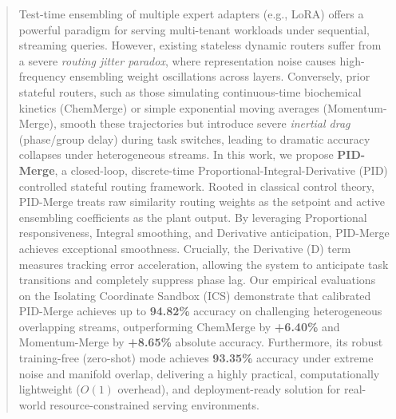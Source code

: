 \begin{abstract}
Test-time ensembling of multiple expert adapters (e.g., LoRA) offers a powerful paradigm for serving multi-tenant workloads under sequential, streaming queries. However, existing stateless dynamic routers suffer from a severe \emph{routing jitter paradox}, where representation noise causes high-frequency ensembling weight oscillations across layers. Conversely, prior stateful routers, such as those simulating continuous-time biochemical kinetics (ChemMerge) or simple exponential moving averages (Momentum-Merge), smooth these trajectories but introduce severe \emph{inertial drag} (phase/group delay) during task switches, leading to dramatic accuracy collapses under heterogeneous streams. In this work, we propose \textbf{PID-Merge}, a closed-loop, discrete-time Proportional-Integral-Derivative (PID) controlled stateful routing framework. Rooted in classical control theory, PID-Merge treats raw similarity routing weights as the setpoint and active ensembling coefficients as the plant output. By leveraging Proportional responsiveness, Integral smoothing, and Derivative anticipation, PID-Merge achieves exceptional smoothness. Crucially, the Derivative (D) term measures tracking error acceleration, allowing the system to anticipate task transitions and completely suppress phase lag. Our empirical evaluations on the Isolating Coordinate Sandbox (ICS) demonstrate that calibrated PID-Merge achieves up to \textbf{94.82\%} accuracy on challenging heterogeneous overlapping streams, outperforming ChemMerge by \textbf{+6.40\%} and Momentum-Merge by \textbf{+8.65\%} absolute accuracy. Furthermore, its robust training-free (zero-shot) mode achieves \textbf{93.35\%} accuracy under extreme noise and manifold overlap, delivering a highly practical, computationally lightweight ($O(1)$ overhead), and deployment-ready solution for real-world resource-constrained serving environments.
\end{abstract}

